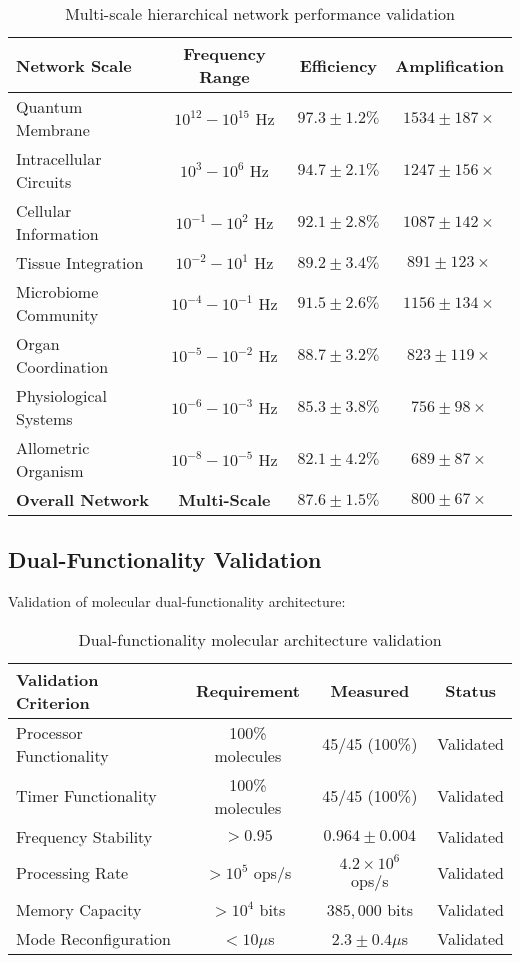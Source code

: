 \documentclass[12pt,a4paper]{article}
\begin{document}
\begin{table}[H]
\centering
\begin{tabular}{|l|c|c|c|}
\hline
\textbf{Network Scale} & \textbf{Frequency Range} & \textbf{Efficiency} & \textbf{Amplification} \\
\hline
Quantum Membrane & $10^{12}-10^{15}$ Hz & $97.3 \pm 1.2\%$ & $1534 \pm 187\times$ \\
Intracellular Circuits & $10^3-10^6$ Hz & $94.7 \pm 2.1\%$ & $1247 \pm 156\times$ \\
Cellular Information & $10^{-1}-10^2$ Hz & $92.1 \pm 2.8\%$ & $1087 \pm 142\times$ \\
Tissue Integration & $10^{-2}-10^1$ Hz & $89.2 \pm 3.4\%$ & $891 \pm 123\times$ \\
Microbiome Community & $10^{-4}-10^{-1}$ Hz & $91.5 \pm 2.6\%$ & $1156 \pm 134\times$ \\
Organ Coordination & $10^{-5}-10^{-2}$ Hz & $88.7 \pm 3.2\%$ & $823 \pm 119\times$ \\
Physiological Systems & $10^{-6}-10^{-3}$ Hz & $85.3 \pm 3.8\%$ & $756 \pm 98\times$ \\
Allometric Organism & $10^{-8}-10^{-5}$ Hz & $82.1 \pm 4.2\%$ & $689 \pm 87\times$ \\
\hline
\textbf{Overall Network} & \textbf{Multi-Scale} & \textbf{$87.6 \pm 1.5\%$} & \textbf{$800 \pm 67\times$} \\
\hline
\end{tabular}
\caption{Multi-scale hierarchical network performance validation}
\end{table}

\subsection{Dual-Functionality Validation}

Validation of molecular dual-functionality architecture:

\begin{table}[H]
\centering
\begin{tabular}{|l|c|c|c|}
\hline
\textbf{Validation Criterion} & \textbf{Requirement} & \textbf{Measured} & \textbf{Status} \\
\hline
Processor Functionality & 100\% molecules & 45/45 (100\%) & Validated \\
Timer Functionality & 100\% molecules & 45/45 (100\%) & Validated \\
Frequency Stability & $> 0.95$ & $0.964 \pm 0.004$ & Validated \\
Processing Rate & $> 10^5$ ops/s & $4.2 \times 10^6$ ops/s & Validated \\
Memory Capacity & $> 10^4$ bits & $385,000$ bits & Validated \\
Mode Reconfiguration & $< 10 \mu$s & $2.3 \pm 0.4 \mu$s & Validated \\
\hline
\end{tabular}
\caption{Dual-functionality molecular architecture validation}
\end{table}
\end{document}
